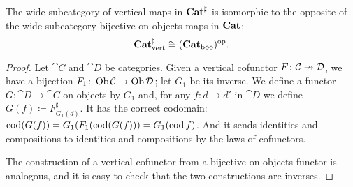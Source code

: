 \documentclass[Book-Poly]{subfiles}
\begin{document}




\begin{proposition}\label{prop.com_vert_cat_boo}
The wide subcategory of vertical maps in $\mathbf{Cat}^\sharp$ is isomorphic to the opposite of the wide subcategory bijective-on-objects maps in $\mathbf{Cat}$:
\[
\mathbf{Cat}^\sharp_{\text{vert}}\cong(\mathbf{Cat}_{\text{boo}})^{\textnormal{op}}.
\]
\end{proposition}
\begin{proof}
Let $\cat{C}$ and $\cat{D}$ be categories. Given a vertical cofunctor $F\colon\mathcal{C}\nrightarrow\mathcal{D}$, we have a bijection $F_1\colon\operatorname{Ob}\mathcal{C}\to\operatorname{Ob}\mathcal{D}$; let $G_1$ be its inverse. We define a functor $G\colon\cat{D}\to\cat{C}$ on objects by $G_1$ and, for any $f\colon d\to d'$ in $\cat{D}$ we define $G(f)\coloneqq F^\sharp_{G_1(d)}$. It has the correct codomain: $\operatorname{cod}(G(f))=G_1(F_1(\operatorname{cod}(G(f)))=G_1(\operatorname{cod} f)$. And it sends identities and compositions to identities and compositions by the laws of cofunctors.

The construction of a vertical cofunctor from a bijective-on-objects functor is analogous, and it is easy to check that the two constructions are inverses.
\end{proof}
\end{document}

